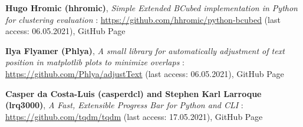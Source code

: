 \begin{thebibliography}{9}
\textbf{Hugo Hromic (hhromic)},
\textit{Simple Extended BCubed implementation in Python for clustering evaluation} : \url{https://github.com/hhromic/python-bcubed} (last access: 06.05.2021),
GitHub Page

\textbf{Ilya Flyamer (Phlya)},
\textit{A small library for automatically adjustment of text position in matplotlib plots to minimize overlaps} : \url{https://github.com/Phlya/adjustText} (last access: 06.05.2021),
GitHub Page

\textbf{Casper da Costa-Luis (casperdcl) and Stephen Karl Larroque (lrq3000)},
\textit{A Fast, Extensible Progress Bar for Python and CLI} : \url{https://github.com/tqdm/tqdm} (last access: 17.05.2021),
GitHub Page

\end{thebibliography}
